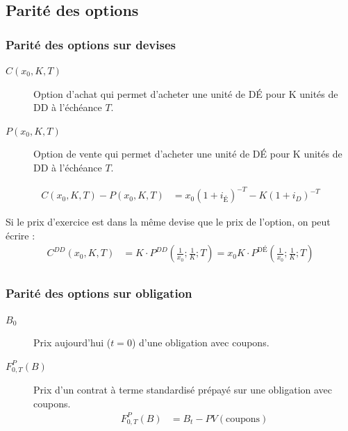\documentclass[10pt, french]{article}
\begin{document}
\begin{multicols*}{2}
\columnbreak
\subsection{Parité des options}
\subsubsection*{Parité des options sur devises}
\begin{distributions}[Notation]
\begin{description}
	\item[$C(x_0, K, T)$]	Option d'achat qui permet d'acheter une unité de DÉ pour K unités de DD à l'échéance $T$.
	\item[$P(x_0, K, T)$] 	Option de vente qui permet d'acheter une unité de DÉ pour K unités de DD à l'échéance $T$.
\end{description}
\end{distributions}

\begin{align*}
	C(x_0, K,T) - P(x_0, K, T) 
	&= 	x_0 (1 + i_{\text{É}})^{-T} - K(1 + i_D)^{-T}
\end{align*}

Si le prix d'exercice est dans la même devise que le prix de l'option, on peut écrire :
\begin{align*}
	C^{DD}(x_0, K, T) 
	&= 	K \cdot P^{DD}\left( \frac{1}{x_0}; \frac{1}{K}; T \right) 
	= 	x_0	K \cdot P^{\text{DÉ}} \left( \frac{1}{x_0}; \frac{1}{K}; T \right) \\
\end{align*}


\subsubsection*{Parité des options sur obligation}
\begin{distributions}[Notation]
\begin{description}
	\item[$B_{0}$]	Prix aujourd'hui ($t = 0$) d'une obligation avec coupons.
	\item[$F_{0, T}^{P}(B)$]	Prix d'un contrat à terme standardisé prépayé sur une obligation avec coupons.
		\setlength{\mathindent}{-1cm}
		\begin{align*}
		F_{0, T}^{P}(B) 
		&=	B_{t} - PV(\text{coupons})
		\end{align*}
		\setlength{\mathindent}{1cm}
\end{description}
\end{distributions}


\end{multicols*}
\end{document}
